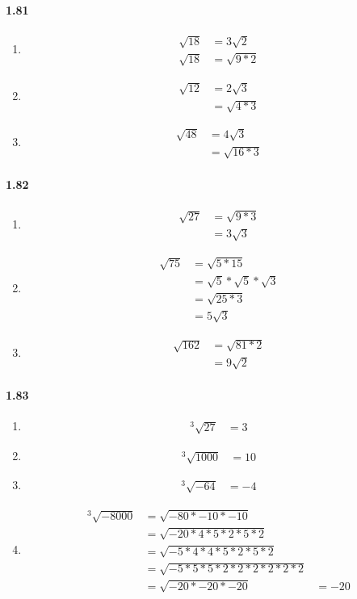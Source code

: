 \documentclass{article}
\newcommand\litem[1]{\item{\bfseries#1\space}}
\begin{document}
\paragraph{1.81}
\begin{enumerate}[label=\emph{\alph*})]
\litem{
\begin{align*}
  \sqrt{18} &= 3\sqrt{2} \\
  \sqrt{18} &= \sqrt{9 * 2}
\end{align*}
}
\litem{
\begin{align*}
  \sqrt{12} &= 2\sqrt{3} \\
  &= \sqrt{4 * 3}
\end{align*}
}
\litem{
\begin{align*}
  \sqrt{48} &= 4\sqrt{3} \\
  &= \sqrt{16 * 3}
\end{align*}
}
\end{enumerate}

\paragraph{1.82}
\begin{enumerate}[label=\emph{\alph*})]
\litem{
\begin{align*}
  \sqrt{27} &= \sqrt{9 * 3} \\
  &= 3 \sqrt{3}
\end{align*}
}
\litem{
\begin{align*}
  \sqrt{75} &= \sqrt{5 * 15} \\
  &= \sqrt{5} * \sqrt{5} * \sqrt{3} \\
  &= \sqrt{25 * 3} \\
  &= 5\sqrt{3}
\end{align*}
}
\litem{
\begin{align*}
  \sqrt{162} &= \sqrt{81 * 2} \\
  &= 9\sqrt{2}
\end{align*}
}
\end{enumerate}

\paragraph{1.83}
\begin{enumerate}[label=\emph{\alph*})]
\litem{
\begin{align*}
  ^3\sqrt{27} &= 3 
\end{align*}
}
\litem{
\begin{align*}
  ^3\sqrt{1000} &= 10
\end{align*}
}
\litem{
\begin{align*}
  ^3\sqrt{-64} &= -4 
\end{align*}
}
\litem{
\begin{align*}
  ^3\sqrt{-8000} &= \sqrt{-80 * -10 * -10} \\
  &= \sqrt{-20 * 4 * 5 * 2 * 5 * 2} \\
  &= \sqrt{-5 * 4 * 4 * 5 * 2 * 5 * 2} \\
  &= \sqrt{-5 * 5 * 5 * 2 * 2 * 2 * 2 * 2 * 2} \\
  &= \sqrt{-20 * -20 * -20}
  &= -20
\end{align*}
}
\end{enumerate}
\end{document}
